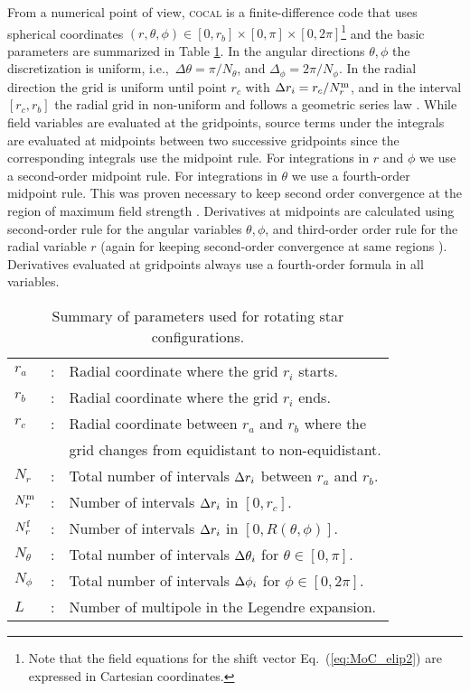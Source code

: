 \documentclass[twocolumn,superscriptaddress,showpacs,prd,aps,amsmath,amssymb,nofootinbib]{revtex4-1}
\newcommand{\cocal}{\textsc{cocal}}
\newcommand{\ie}{i.e.,~}
\begin{document}
From a numerical point of view, \cocal{} is a finite-difference code
that uses spherical coordinates $(r,\theta,\phi)\in [0,r_b]\times
[0,\pi]\times [0,2\pi]$\footnote{Note that the field equations for the
  shift vector Eq.~(\ref{eq:MoC_elip2}) are expressed in Cartesian
  coordinates.}  and the basic parameters are summarized in Table
\ref{tab:grid}.  In the angular directions $\theta,\phi$ the
discretization is uniform, \ie $\Delta\theta=\pi/N_\theta$, and
$\Delta_\phi=2\pi/N_\phi$. In the radial direction the grid is uniform
until point $r_c$ with $\Delta r_i = r_c/{N_r^{\rm m}}$, and in the interval
$[r_c,r_b]$ the radial grid in non-uniform and follows a geometric series
law \cite{Huang08}. While field variables are evaluated at the
gridpoints, source terms under the integrals are evaluated at midpoints
between two successive gridpoints since the corresponding integrals use
the midpoint rule. For integrations in $r$ and $\phi$ we use a
second-order midpoint rule.  For integrations in $\theta$ we use a
fourth-order midpoint rule. This was proven necessary to keep second
order convergence at the region of maximum field strength
\cite{Uryu:2012b}.  Derivatives at midpoints are calculated using
second-order rule for the angular variables $\theta,\phi$, and
third-order order rule for the radial variable $r$ (again for keeping
second-order convergence at same regions \cite{Uryu2012}). Derivatives
evaluated at gridpoints always use a fourth-order formula in all
variables.

\begin{table}
\begin{tabular}{lll}
\hline
$r_{a}$ &:& Radial coordinate where the grid $r_i$ starts.                \\
$r_{b}$ &:& Radial coordinate where the grid $r_i$ ends.              \\
$r_{c}$ &:& Radial coordinate between $r_{a}$ and $r_{b}$ where the      \\
&\phantom{:}& grid changes from equidistant to non-equidistant.        \\
$N_{r}$ &:& Total number of intervals $\Delta r_i$ between $r_{a}$ and $r_{b}$. \\
${N_r^{\rm m}}$ &: & Number of intervals $\Delta r_i$ in $[0,r_{c}]$. \\
${N_r^{\rm f}}$ &:& Number of intervals $\Delta r_i$ in $[0,R(\theta,\phi)]$. \\
$N_{\theta}$ &:& Total number of intervals $\Delta \theta_i$ for $\theta\in[0,\pi]$. \\
$N_{\phi}$ &:& Total number of intervals $\Delta \phi_i$ for $\phi\in[0,2\pi]$. \\
$L$ &:& Number of multipole in the Legendre expansion. \\
\hline
\end{tabular}  
\caption{Summary of parameters used for rotating star configurations.}
\label{tab:grid}
\end{table}
\end{document}
